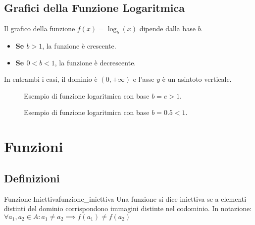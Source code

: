 \documentclass{article}
\begin{document}
\subsection{Grafici della Funzione Logaritmica}
Il grafico della funzione $f(x) = \log_b(x)$ dipende dalla base $b$.
\begin{itemize}
    \item \textbf{Se $b > 1$}, la funzione è crescente.
    \item \textbf{Se $0 < b < 1$}, la funzione è decrescente.
\end{itemize}
In entrambi i casi, il dominio è $(0, +\infty)$ e l'asse $y$ è un asintoto verticale.

\begin{figure}[!htbp]
\centering
{}
\caption{Esempio di funzione logaritmica con base $b=e > 1$.}
\end{figure}

\begin{figure}[!htbp]
\centering
{}
\caption{Esempio di funzione logaritmica con base $b=0.5 < 1$.}
\end{figure}


\section{Funzioni}

\subsection{Definizioni}

\begin{definition}{Funzione Iniettiva}{funzione_iniettiva}
    Una funzione si dice iniettiva se a elementi distinti del dominio corrispondono immagini distinte nel codominio. In notazione: $ \forall a_1, a_2 \in A: a_1 \neq a_2 \implies f(a_1) \neq f(a_2)$
\end{definition}
\end{document}
